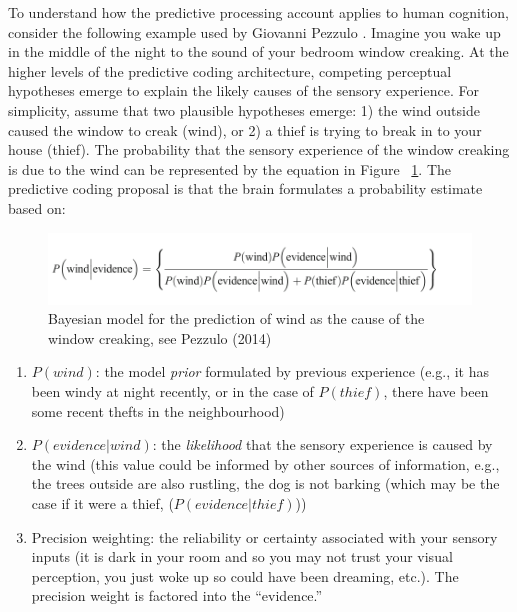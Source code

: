 \begin{CJK}{UTF8}{gbsn}
To understand how the predictive processing account applies to human cognition, consider the following example used by Giovanni Pezzulo \textcite{Pezzulo2013}.  Imagine you wake up in the middle of the night to the sound of your bedroom window creaking.  At the higher levels of the predictive coding architecture, competing perceptual hypotheses emerge to explain the likely causes of the sensory experience.  For simplicity, assume that two plausible hypotheses emerge: 1) the wind outside caused the window to creak (wind), or 2) a thief is trying to break in to your house (thief).  The probability that the sensory experience of the window creaking is due to the wind can be represented by the equation in Figure ~\ref{fig:windThief}.  The predictive coding proposal is that the brain formulates a probability estimate based on:

\begin{figure}[htbp]
  \begin{center}
    \includegraphics[scale=.5]{images/windThief.png}
      \caption{Bayesian model for the prediction of wind as the cause of the window creaking, see Pezzulo (2014)}
        \label{fig:windThief}
   \end{center}
\end{figure}


\begin{enumerate}
  \item $P(wind)$: the model \textit{prior} formulated by previous experience (e.g., it has been windy at night recently, or in the case of $P(thief)$, there have been some recent thefts in the neighbourhood)
  \item $P(evidence|wind)$: the \textit{likelihood} that the sensory experience is caused by the wind (this value could be informed by other sources of information, e.g., the trees outside are also rustling, the dog is not barking (which may be the case if it were a thief, ($P(evidence|thief)$))
  \item Precision weighting: the reliability or certainty associated with your sensory inputs (it is dark in your room and so you may not trust your visual perception, you just woke up so could have been dreaming, etc.).  The precision weight is factored into the ``evidence.''
\end{enumerate}


\end{CJK}
